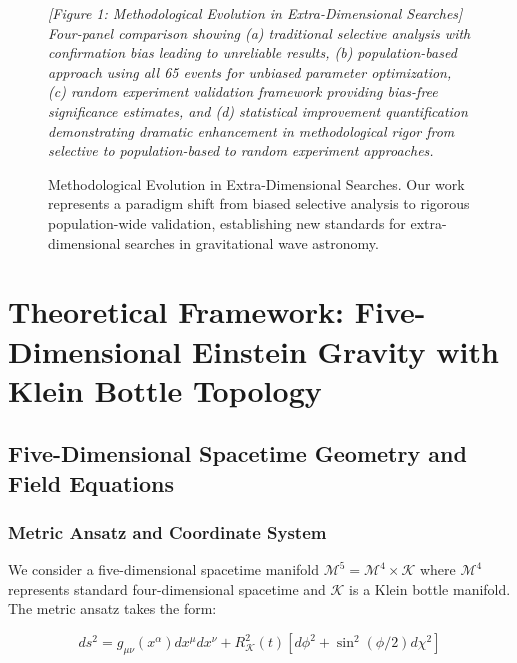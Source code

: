 \documentclass[reprint,amsmath,amssymb,aps,prd]{revtex4-2}
\newcommand{\Klein}{\mathcal{K}}
\newcommand{\KleinRadius}{R_\Klein}
\begin{document}
\begin{figure}[htbp]
\centering
\textit{[Figure 1: Methodological Evolution in Extra-Dimensional Searches]}
\textit{Four-panel comparison showing (a) traditional selective analysis with confirmation bias leading to unreliable results, (b) population-based approach using all 65 events for unbiased parameter optimization, (c) random experiment validation framework providing bias-free significance estimates, and (d) statistical improvement quantification demonstrating dramatic enhancement in methodological rigor from selective to population-based to random experiment approaches.}
\caption{Methodological Evolution in Extra-Dimensional Searches. Our work represents a paradigm shift from biased selective analysis to rigorous population-wide validation, establishing new standards for extra-dimensional searches in gravitational wave astronomy.}
\label{fig:methodology}
\end{figure}


\section{Theoretical Framework: Five-Dimensional Einstein Gravity with Klein Bottle Topology}
\label{sec:theory}

\subsection{Five-Dimensional Spacetime Geometry and Field Equations}

\subsubsection{Metric Ansatz and Coordinate System}

We consider a five-dimensional spacetime manifold $\mathcal{M}^5 = \mathcal{M}^4 \times \Klein$ where $\mathcal{M}^4$ represents standard four-dimensional spacetime and $\Klein$ is a Klein bottle manifold. The metric ansatz takes the form:

\begin{equation}
ds^2 = g_{\mu\nu}(x^\alpha) dx^\mu dx^\nu + \KleinRadius^2(t) \left[ d\phi^2 + \sin^2(\phi/2) d\chi^2 \right]
\label{eq:full_5d_metric}
\end{equation}
\end{document}
